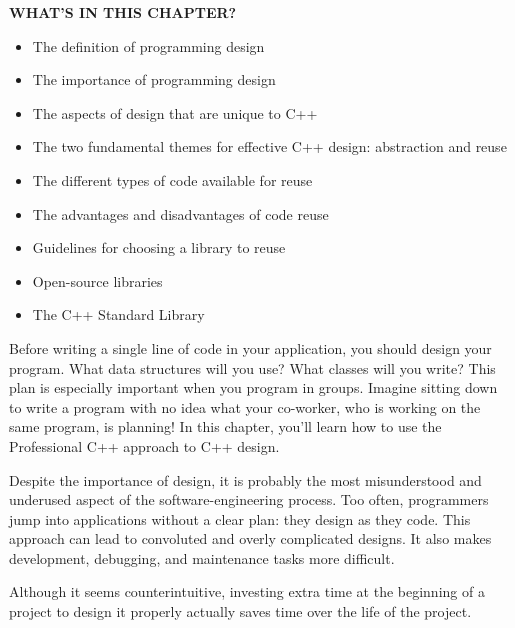 \noindent
\textbf{WHAT’S IN THIS CHAPTER?}

\begin{itemize}
\item
The definition of programming design

\item
The importance of programming design

\item
The aspects of design that are unique to C++

\item
The two fundamental themes for effective C++ design: abstraction and reuse

\item
The different types of code available for reuse

\item
The advantages and disadvantages of code reuse

\item
Guidelines for choosing a library to reuse

\item
Open-source libraries

\item
The C++ Standard Library
\end{itemize}

Before writing a single line of code in your application, you should design your program. What data structures will you use? What classes will you write? This plan is especially important when you program in groups. Imagine sitting down to write a program with no idea what your co-worker, who is working on the same program, is planning! In this chapter, you’ll learn how to use the Professional C++ approach to C++ design.

Despite the importance of design, it is probably the most misunderstood and underused aspect of the software-engineering process. Too often, programmers jump into applications without a clear plan: they design as they code. This approach can lead to convoluted and overly complicated designs. It also makes development, debugging, and maintenance tasks more difficult.

Although it seems counterintuitive, investing extra time at the beginning of a project to design it properly actually saves time over the life of the project.












